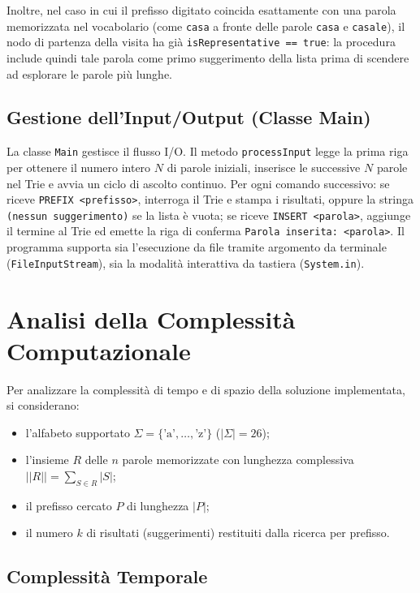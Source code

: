 \documentclass[11pt,a4paper]{article}
\begin{document}
Inoltre, nel caso in cui il prefisso digitato coincida esattamente con una parola memorizzata nel vocabolario (come \texttt{casa} a fronte delle parole \texttt{casa} e \texttt{casale}), il nodo di partenza della visita ha già \texttt{isRepresentative == true}: la procedura include quindi tale parola come primo suggerimento della lista prima di scendere ad esplorare le parole più lunghe.

\subsection{Gestione dell'Input/Output (Classe Main)}
La classe \texttt{Main} gestisce il flusso I/O. Il metodo \texttt{processInput} legge la prima riga per ottenere il numero intero $N$ di parole iniziali, inserisce le successive $N$ parole nel Trie e avvia un ciclo di ascolto continuo. Per ogni comando successivo:
se riceve \texttt{PREFIX <prefisso>}, interroga il Trie e stampa i risultati, oppure la stringa \texttt{(nessun suggerimento)} se la lista è vuota;
se riceve \texttt{INSERT <parola>}, aggiunge il termine al Trie ed emette la riga di conferma \texttt{Parola inserita: <parola>}.
Il programma supporta sia l'esecuzione da file tramite argomento da terminale (\texttt{FileInputStream}), sia la modalità interattiva da tastiera (\texttt{System.in}).


\section{Analisi della Complessità Computazionale}

Per analizzare la complessità di tempo e di spazio della soluzione implementata, si considerano:

\begin{itemize}
    \item l'alfabeto supportato  $\Sigma = \{\text{'a'}, \dots, \text{'z'}\}$ ($|\Sigma| = 26$);
    \item l'insieme $R$ delle $n$ parole memorizzate con lunghezza complessiva $||R|| = \sum_{S \in R} |S|$;
    \item il prefisso cercato $P$ di lunghezza $|P|$;
    \item il numero $k$ di risultati (suggerimenti) restituiti dalla ricerca per prefisso.

\end{itemize}


\subsection{Complessità Temporale}
\end{document}
